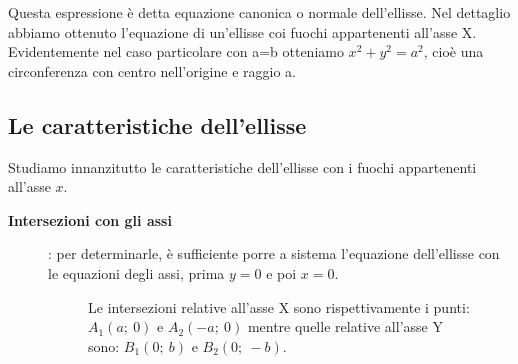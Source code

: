 Questa espressione è detta equazione canonica o normale dell'ellisse.
Nel dettaglio abbiamo ottenuto l'equazione di un'ellisse coi fuochi 
appartenenti all'asse X.
Evidentemente nel caso particolare con a=b otteniamo $ x^{2}+y^{2}=a^{2}$, 
cioè una circonferenza con centro nell'origine e raggio a.

\subsection{Le caratteristiche dell'ellisse}

Studiamo innanzitutto le caratteristiche dell'ellisse con i fuochi appartenenti all'asse $x$.

\begin{description}
\item [\textbf{Intersezioni con gli assi}]: per determinarle, è sufficiente porre a sistema l'equazione dell'ellisse con le 
equazioni degli assi, prima $y=0$ e poi $x=0$.
\begin{figure}[h]
\hspace{8mm}
\begin{minipage}{.5\textwidth}
Le intersezioni relative all'asse X sono rispettivamente i punti:
$A_{1}(a;~0)$ e $A_{2}(-a;~0)$ mentre quelle relative all'asse Y sono:
$B_{1}(0;~b)$ e $B_{2}(0;~-b)$.


\end{minipage}
\end{figure}
\end{description}
